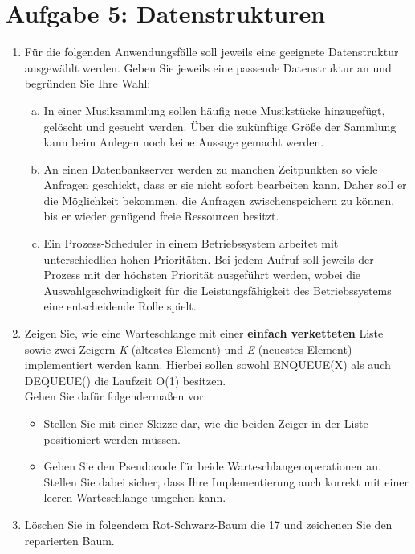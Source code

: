 \documentclass{scrartcl}
\begin{document}
\section*{Aufgabe 5: Datenstrukturen}
\begin{enumerate}[(1)]
\item Für die folgenden Anwendungsfälle soll jeweils eine geeignete Datenstruktur ausgewählt werden. Geben Sie jeweils eine passende Datenstruktur an und begründen Sie Ihre Wahl:
\begin{enumerate}[(a)]
\item In einer Musiksammlung sollen häufig neue Musikstücke hinzugefügt, gelöscht und gesucht werden. Über die zukünftige Größe der Sammlung kann beim Anlegen noch keine Aussage gemacht werden.
\item An einen Datenbankserver werden zu manchen Zeitpunkten so viele Anfragen geschickt, dass er sie nicht sofort bearbeiten kann. Daher soll er die Möglichkeit bekommen, die Anfragen zwischenspeichern zu können, bis er wieder genügend freie Ressourcen besitzt.
\item Ein Prozess-Scheduler in einem Betriebssystem arbeitet mit unterschiedlich hohen Prioritäten. Bei jedem Aufruf soll jeweils der Prozess mit der höchsten Priorität ausgeführt werden, wobei die Auswahlgeschwindigkeit für die Leistungsfähigkeit des Betriebssystems eine entscheidende Rolle spielt.
\end{enumerate}

\item Zeigen Sie, wie eine Warteschlange mit einer \textbf{einfach verketteten} Liste sowie zwei Zeigern \textit{K} (ältestes Element) und \textit{E} (neuestes Element) implementiert werden kann. Hierbei sollen sowohl ENQUEUE(X) als auch DEQUEUE() die Laufzeit O(1) besitzen.\\
Gehen Sie dafür folgendermaßen vor:\\
\begin{itemize}
	\item Stellen Sie mit einer Skizze dar, wie die beiden Zeiger in der Liste positioniert werden müssen.
	\item Geben Sie den Pseudocode für beide Warteschlangenoperationen an. Stellen  Sie dabei sicher, dass Ihre Implementierung auch korrekt mit einer leeren Warteschlange umgehen kann.
\end{itemize}

\item Löschen Sie in folgendem Rot-Schwarz-Baum die 17 und zeichenen Sie den reparierten Baum.


\end{enumerate}
\end{document}
